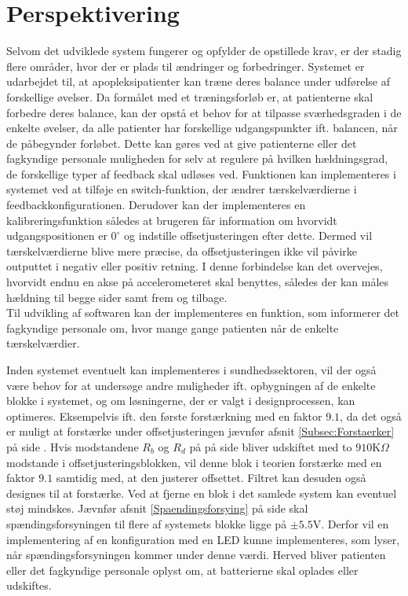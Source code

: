 \section{Perspektivering}
Selvom det udviklede system fungerer og opfylder de opstillede krav, er der stadig flere områder, hvor der er plads til ændringer og forbedringer. 
Systemet er udarbejdet til, at apopleksipatienter kan træne deres balance under udførelse af forskellige øvelser. Da formålet med et træningsforløb er, at patienterne skal forbedre deres balance, kan der opstå et behov for at tilpasse sværhedsgraden i de enkelte øvelser, da alle patienter har forskellige udgangspunkter ift. balancen, når de påbegynder forløbet. Dette kan gøres ved at give patienterne eller det fagkyndige personale muligheden for selv at regulere på hvilken hældningsgrad, de forskellige typer af feedback skal udløses ved. Funktionen kan implementeres i systemet ved at tilføje en switch-funktion, der ændrer tærskelværdierne i feedbackkonfigurationen. Derudover kan der implementeres en kalibreringsfunktion således at brugeren får information om hvorvidt udgangspositionen er $0^{\circ}$ og indstille offsetjusteringen efter dette. Dermed vil tærskelværdierne blive mere præcise, da offsetjusteringen ikke vil påvirke outputtet i negativ eller positiv retning. %
I denne forbindelse kan det overvejes, hvorvidt endnu en akse på accelerometeret skal benyttes, således der kan måles hældning til begge sider samt frem og tilbage. \\
Til udvikling af softwaren kan der implementeres en funktion, som informerer det fagkyndige personale om, hvor mange gange patienten når de enkelte tærskelværdier.   

Inden systemet eventuelt kan implementeres i sundhedssektoren, vil der også være behov for at undersøge andre muligheder ift. opbygningen af de enkelte blokke i systemet, og om løsningerne, der er valgt i designprocessen, kan optimeres. Eksempelvis ift. den første forstærkning med en faktor $9.1$, da det også er muligt at forstærke under offsetjusteringen jævnfør afsnit \ref{Subsec:Forstaerker} på side \pageref{Subsec:Forstaerker}. Hvis modstandene $R_{b}$ og $R_{d}$ på  på side \pageref{fig:Forstaerker_faktor18} bliver udskiftet med to $910$K$\Omega$ modstande  i offsetjusteringsblokken, vil denne blok i teorien forstærke med en faktor $9.1$ samtidig med, at den justerer offsettet. Filtret kan desuden også designes til at forstærke. Ved at fjerne en blok i det samlede system kan eventuel støj mindskes. Jævnfør afsnit \ref{Spaendingsforsying} på side \pageref{Spaendingsforsying} skal spændingsforsyningen til flere af systemets blokke ligge på $\pm5.5$V. Derfor vil en implementering af en konfiguration med en LED kunne implementeres, som lyser, når spændingsforsyningen kommer under denne værdi. Herved bliver patienten eller det fagkyndige personale oplyst om, at batterierne skal oplades eller udskiftes.

